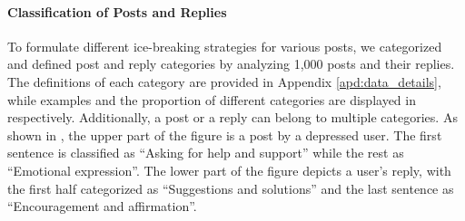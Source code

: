 \paragraph{Classification of Posts and Replies}
\label{sec:category}
To formulate different ice-breaking strategies for various posts, we categorized and defined post and reply categories by analyzing 1,000 posts and their replies. The definitions of each category are provided in Appendix \ref{apd:data_details}, while examples and the proportion of different categories are displayed in  respectively. Additionally, a post or a reply can belong to multiple categories. As shown in , the upper part of the figure is a post by a depressed user. The first sentence is classified as  ``Asking for help and support'' while the rest as ``Emotional expression''. The lower part of the figure depicts a user's reply, with the first half categorized as ``Suggestions and solutions'' and the last sentence as ``Encouragement and affirmation''.
